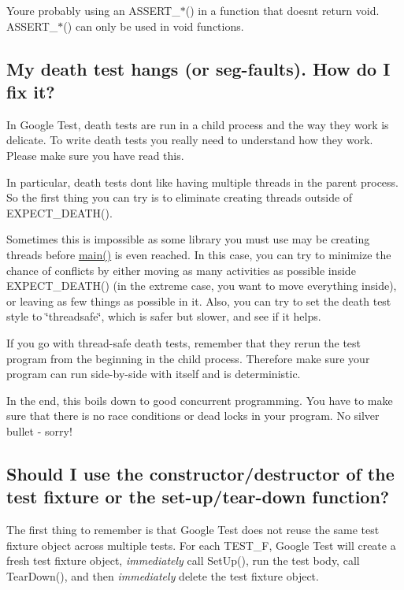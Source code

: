 You\textquotesingle{}re probably using an {\ttfamily A\+S\+S\+E\+R\+T\+\_\+$\ast$()} in a function that doesn\textquotesingle{}t return {\ttfamily void}. {\ttfamily A\+S\+S\+E\+R\+T\+\_\+$\ast$()} can only be used in {\ttfamily void} functions.

\subsection*{My death test hangs (or seg-\/faults). How do I fix it?}

In Google Test, death tests are run in a child process and the way they work is delicate. To write death tests you really need to understand how they work. Please make sure you have read this.

In particular, death tests don\textquotesingle{}t like having multiple threads in the parent process. So the first thing you can try is to eliminate creating threads outside of {\ttfamily E\+X\+P\+E\+C\+T\+\_\+\+D\+E\+A\+T\+H()}.

Sometimes this is impossible as some library you must use may be creating threads before {\ttfamily \hyperlink{app_2main_8cpp_ae66f6b31b5ad750f1fe042a706a4e3d4}{main()}} is even reached. In this case, you can try to minimize the chance of conflicts by either moving as many activities as possible inside {\ttfamily E\+X\+P\+E\+C\+T\+\_\+\+D\+E\+A\+T\+H()} (in the extreme case, you want to move everything inside), or leaving as few things as possible in it. Also, you can try to set the death test style to {\ttfamily \char`\"{}threadsafe\char`\"{}}, which is safer but slower, and see if it helps.

If you go with thread-\/safe death tests, remember that they rerun the test program from the beginning in the child process. Therefore make sure your program can run side-\/by-\/side with itself and is deterministic.

In the end, this boils down to good concurrent programming. You have to make sure that there is no race conditions or dead locks in your program. No silver bullet -\/ sorry!

\subsection*{Should I use the constructor/destructor of the test fixture or the set-\/up/tear-\/down function?}

The first thing to remember is that Google Test does not reuse the same test fixture object across multiple tests. For each {\ttfamily T\+E\+S\+T\+\_\+F}, Google Test will create a fresh test fixture object, {\itshape immediately} call {\ttfamily Set\+Up()}, run the test body, call {\ttfamily Tear\+Down()}, and then {\itshape immediately} delete the test fixture object.

